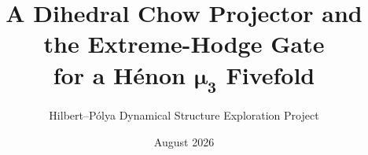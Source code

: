 \documentclass[11pt]{article}
\title{A Dihedral Chow Projector and the Extreme-Hodge Gate\\
for a H\'enon \(\boldsymbol{\mu_3}\) Fivefold}
\author{Hilbert--P\'olya Dynamical Structure Exploration Project}
\date{August 2026}
\theoremstyle{remark}
\begin{document}
\maketitle










\appendix


\begingroup
\raggedright


\endgroup
\end{document}
